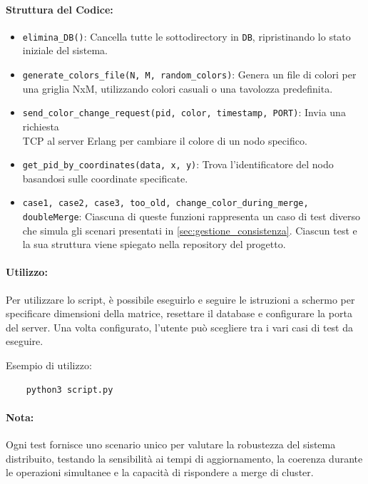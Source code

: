 \documentclass[12pt, a4paper]{report}
\begin{document}
\paragraph{Struttura del Codice:}
\begin{itemize}
    \item \texttt{elimina\_DB()}: Cancella tutte le sottodirectory in \texttt{DB}, ripristinando lo stato iniziale del sistema.
    \item \texttt{generate\_colors\_file(N, M, random\_colors)}: Genera un file di colori per una griglia NxM, utilizzando colori casuali o una tavolozza predefinita.
    \item \texttt{send\_color\_change\_request(pid, color, timestamp, PORT)}: Invia una richiesta \\TCP al server Erlang per cambiare il colore di un nodo specifico.
    \item \texttt{get\_pid\_by\_coordinates(data, x, y)}: Trova l’identificatore del nodo basandosi sulle coordinate specificate.
    \item \texttt{case1, case2, case3, too\_old, change\_color\_during\_merge, doubleMerge}: Ciascuna di queste funzioni rappresenta un caso di test diverso che simula gli scenari presentati in \ref{sec:gestione_consistenza}. Ciascun test e la sua struttura viene spiegato nella repository del progetto.
\end{itemize}


\paragraph{Utilizzo:}
Per utilizzare lo script, è possibile eseguirlo e seguire le istruzioni a schermo per specificare dimensioni della matrice, resettare il database e configurare la porta del server.
Una volta configurato, l’utente può scegliere tra i vari casi di test da eseguire.

Esempio di utilizzo:
\begin{verbatim}
    python3 script.py
\end{verbatim}


\paragraph{Nota:}
Ogni test fornisce uno scenario unico per valutare la robustezza del sistema distribuito, testando la sensibilità ai tempi di aggiornamento, la coerenza durante le operazioni simultanee e la capacità di rispondere a merge di cluster.
\end{document}

